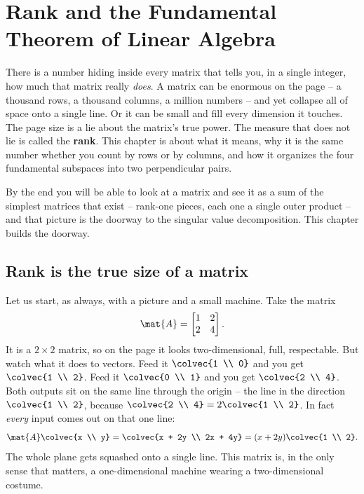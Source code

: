 \chapter{Rank and the Fundamental Theorem of Linear Algebra}

There is a number hiding inside every matrix that tells you, in a single integer,
how much that matrix really \emph{does}. A matrix can be enormous on the page --
a thousand rows, a thousand columns, a million numbers -- and yet collapse all of
space onto a single line. Or it can be small and fill every dimension it touches.
The page size is a lie about the matrix's true power. The measure that does not
lie is called the \textbf{rank}. This chapter is about what it means, why it is
the same number whether you count by rows or by columns, and how it organizes the
four fundamental subspaces into two perpendicular pairs.

By the end you will be able to look at a matrix and see it as a sum of the
simplest matrices that exist -- rank-one pieces, each one a single outer product
-- and that picture is the doorway to the singular value decomposition. This
chapter builds the doorway.

\chapterline

\section{Rank is the true size of a matrix}

Let us start, as always, with a picture and a small machine. Take the matrix
\[
  \mat{A} = \begin{bmatrix} 1 & 2 \\ 2 & 4 \end{bmatrix}.
\]
It is a $2\times 2$ matrix, so on the page it looks two-dimensional, full,
respectable. But watch what it does to vectors. Feed it $\colvec{1 \\ 0}$ and you
get $\colvec{1 \\ 2}$. Feed it $\colvec{0 \\ 1}$ and you get $\colvec{2 \\ 4}$.
Both outputs sit on the same line through the origin -- the line in the direction
$\colvec{1 \\ 2}$, because $\colvec{2 \\ 4} = 2\colvec{1 \\ 2}$. In fact
\emph{every} input comes out on that one line:
\[
  \mat{A}\colvec{x \\ y} = \colvec{x + 2y \\ 2x + 4y} = (x + 2y)\colvec{1 \\ 2}.
\]
The whole plane gets squashed onto a single line. This matrix is, in the only
sense that matters, a one-dimensional machine wearing a two-dimensional costume.

